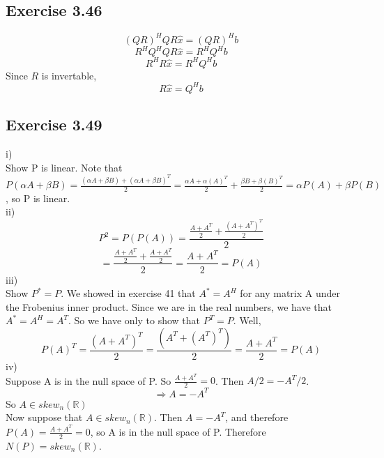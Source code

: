 \documentclass[letterpaper,12pt]{article}
\theoremstyle{definition}
\begin{document}
\subsection*{Exercise 3.46}
\[(QR)^HQR\hat{x}=(QR)^Hb\]
\[R^HQ^HQR\hat{x}=R^HQ^Hb\]
\[R^HR\hat{x}=R^HQ^Hb\]
Since $R$ is invertable,
\[R\hat{x}=Q^Hb\]

\subsection*{Exercise 3.49}
i) \\
Show P is linear. Note that $P(\alpha A+ \beta B) 
=\frac{(\alpha A+ \beta B)+(\alpha A+ \beta B)^{T} } {2} =\frac{\alpha A + \alpha (A)^{T}}{2} + 
\frac{\beta B + \beta (B)^{T}}{2}=\alpha P (A) + \beta P(B)$, so P is linear. \\
ii) \\
 \[P^{2}=P(P(A))=\frac{\frac{A+A^{T}}{2}+\frac{(A+A^{T})^{T}}{2}}{2} \] 
 \[=\frac{\frac{A+A^{T}}{2}+\frac{A+A^{T}}{2}}{2}=\frac{A+A^{T}}{2}=P(A) \] 
iii) \\
Show $P^{*}=P$. We showed in exercise 41 that $A^{*}=A^{H}$ for any matrix A under the Frobenius inner product. Since we are in the real numbers, we have that $A^{*} = A^{H} = A^{T}$. So we have only to show that $P^{T} = P$. Well, 
\[P(A)^{T} = \frac{(A+A^{T})^{T} } {2 } = \frac{(A^{T}+(A^{T})^{T}) } {2 } = \frac{A+A^{T}}{2} = P(A) \] 
iv) \\
Suppose A is in the null space of P. So $\frac{A+A^{T}}{2}=0$. Then $A/2=-A^{T}/2$.  
\[ \Rightarrow A = -A^{T}\] 
So $ A \in skew_{n}(\mathbb{R})$\\
Now suppose that $ A \in skew_{n}(\mathbb{R})$. Then $A=-A^{T}$, and therefore $P(A) = \frac{A+A^{T}}{2} = 0$, so A is in the null space of P.  Therefore $N(P) = skew_{n}(\mathbb{R})$. \\\\
\end{document}
